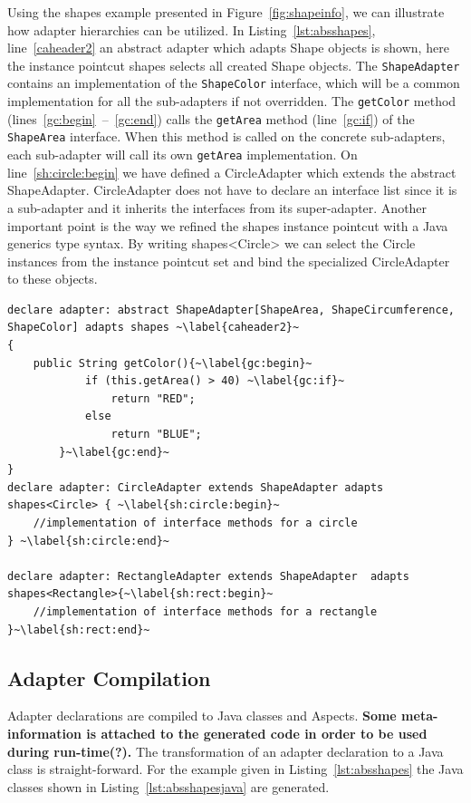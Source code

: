\documentclass{acm_proc_article-sp}
\begin{document}
Using the shapes example presented in Figure~\ref{fig:shapeinfo}, we can illustrate how adapter hierarchies can be utilized. In Listing~\ref{lst:absshapes}, line~\ref{caheader2} an abstract adapter which adapts \textsf{Shape} objects is shown, here the instance pointcut \textsf{shapes} selects all created \textsf{Shape} objects.
The \texttt{ShapeAdapter} contains an implementation of the \texttt{ShapeColor} interface, which will be a common implementation for all the sub-adapters if not overridden. 
The \texttt{getColor} method (lines~\ref{gc:begin}~--~\ref{gc:end}) calls the \texttt{getArea} method (line~\ref{gc:if}) of the \texttt{ShapeArea} interface. When this method is called on the concrete sub-adapters, each sub-adapter will call its own \texttt{getArea} implementation. 
On line~\ref{sh:circle:begin} we have defined a \textsf{CircleAdapter} which extends the abstract \textsf{ShapeAdapter}. \textsf{CircleAdapter} does not have to declare an interface list since it is a sub-adapter and it inherits the interfaces from its super-adapter. 
Another important point is the way we refined the \textsf{shapes} instance pointcut with a Java generics type syntax. 
By writing \textsf{shapes<Circle>} we can select the \textsf{Circle} instances from the instance pointcut set and bind the specialized \textsf{CircleAdapter} to these objects.

\begin{lstlisting}[float, label={lst:absshapes}, caption={An abstract adapter declaration for the \textsf{Shape} hierarchy}]
declare adapter: abstract ShapeAdapter[ShapeArea, ShapeCircumference, ShapeColor] adapts shapes ~\label{caheader2}~
{
	public String getColor(){~\label{gc:begin}~
			if (this.getArea() > 40) ~\label{gc:if}~
				return "RED";
			else
				return "BLUE";
		}~\label{gc:end}~
}
declare adapter: CircleAdapter extends ShapeAdapter adapts shapes<Circle> { ~\label{sh:circle:begin}~
	//implementation of interface methods for a circle
} ~\label{sh:circle:end}~

declare adapter: RectangleAdapter extends ShapeAdapter  adapts shapes<Rectangle>{~\label{sh:rect:begin}~
	//implementation of interface methods for a rectangle
}~\label{sh:rect:end}~
\end{lstlisting} 

\subsection{Adapter Compilation}
Adapter declarations are compiled to Java classes and Aspects. \textbf{Some meta-information is attached to the generated code in order to be used during run-time(?).} The transformation of an adapter declaration to a Java class is straight-forward. For the example given in Listing~\ref{lst:absshapes} the Java classes shown in Listing~\ref{lst:absshapesjava} are generated. 
\end{document}
